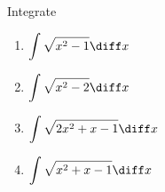 Integrate
\begin{enumerate}[ref={\fcProblemRef}]
\item 
$\displaystyle
\int \sqrt{x^2-1}\diff x
$
\item 
$\displaystyle
\int \sqrt{x^2-2}\diff x
$
\item 
$\displaystyle
\int \sqrt{2x^2+x-1}\diff x
$
\item 
$\displaystyle
\int \sqrt{x^2+x-1}\diff x
$
\end{enumerate}